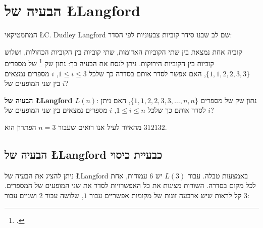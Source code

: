 


\chapter{הבעיה של 
\L{Langford}}
\label{c.langford}

המתמטיקאי
\L{C. Dudley Langford}
שם לב שבנו סידר קוביות צבעוניות לפי הסדר:
\begin{center}

\end{center}

קוביה אחת נמצאת בין שתי הקוביות האדומות, שתי קוביות בין הקוביות הכחולות, ושלוש קוביות בין הקוביות הירוקות. ניתן לנסח את הבעיה כך:
נתון שק%
\footnote{.} של מספרים
$\{1,1,2,2,3,3\}$,
האם אפשר לסדר אותם בסדרה כך שלכל
$1\leq i \leq 3$,
$i$
מספרים נמצאים בין שני המופעים של
$i$?

\textbf{
הבעיה של
\L{Langford} $L(n)$}:
נתון שק של מספרים
$\{1,1,2,2,3,3,\ldots,n,n\}$,
האם ניתן לסדר אותם כך שלכל
$1\leq i \leq n$, $i$
מספרים נמצאים בין שני המופעים של
$i$?


מהאיור לעיל אנו רואים שעבור 
$n=3$
הפתרון הוא
$312132$.




\section{
הבעיה של
\L{Langford}
כבעיית כיסוי}

ניתן להציג את הבעיה של
\L{Langford}
באמצעות טבלה. עבור
$L(3)$
יש
$6$
עמודות, אחת לכל מקום בסדרה. השורות מציגות את כל האפשרויות לסדר את  שני המופעים של המספרים. קל לראות שיש ארבעה זוגות של מקומות אפשריים עבור
$1$,
שלושה עבור
$2$
ושניים עבור
$3$:

